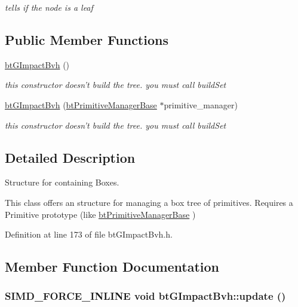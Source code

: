 \begin{CompactItemize}
\begin{CompactList}\small\item\em tells if the node is a leaf \item\end{CompactList}\end{CompactItemize}
\subsection*{Public Member Functions}
\begin{CompactItemize}
\item 
\hypertarget{classbt_g_impact_bvh_b305fcdbd3faf585e253433b7193587e}{
\hyperlink{classbt_g_impact_bvh_b305fcdbd3faf585e253433b7193587e}{btGImpactBvh} ()}
\label{classbt_g_impact_bvh_b305fcdbd3faf585e253433b7193587e}

\begin{CompactList}\small\item\em this constructor doesn't build the tree. you must call buildSet \item\end{CompactList}\item 
\hypertarget{classbt_g_impact_bvh_fbb8405cc5348fc66dc09819bfc60969}{
\hyperlink{classbt_g_impact_bvh_fbb8405cc5348fc66dc09819bfc60969}{btGImpactBvh} (\hyperlink{classbt_primitive_manager_base}{btPrimitiveManagerBase} $\ast$primitive\_\-manager)}
\label{classbt_g_impact_bvh_fbb8405cc5348fc66dc09819bfc60969}

\begin{CompactList}\small\item\em this constructor doesn't build the tree. you must call buildSet \item\end{CompactList}\end{CompactItemize}


\subsection{Detailed Description}
Structure for containing Boxes. 

This class offers an structure for managing a box tree of primitives. Requires a Primitive prototype (like \hyperlink{classbt_primitive_manager_base}{btPrimitiveManagerBase} ) 

Definition at line 173 of file btGImpactBvh.h.

\subsection{Member Function Documentation}
\hypertarget{classbt_g_impact_bvh_c0511b84c8722348fe4295b2a8f40c81}{
\subsubsection[update]{\setlength{\rightskip}{0pt plus 5cm}SIMD\_\-FORCE\_\-INLINE void btGImpactBvh::update ()}}
\label{classbt_g_impact_bvh_c0511b84c8722348fe4295b2a8f40c81}



